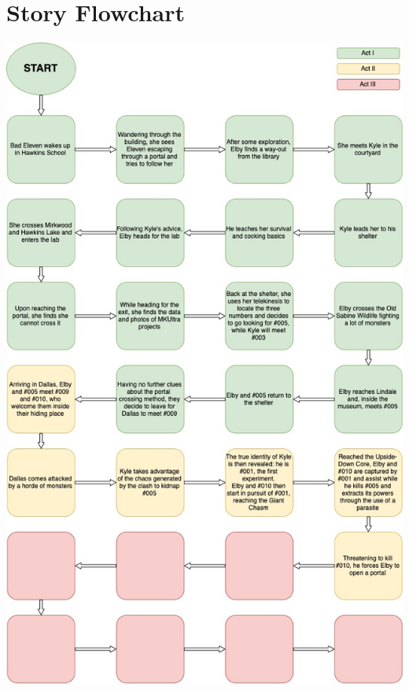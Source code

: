 \section{Story Flowchart}

\vspace*{0.5cm}
\begin{center}
	\includegraphics[width=0.8\linewidth]{images/graphs/story_flowchart.jpg}
\end{center}